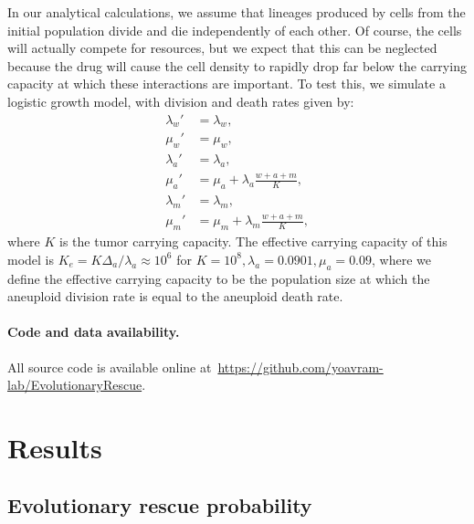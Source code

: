 \documentclass[12pt]{extarticle}
\begin{document}
In our analytical calculations, we assume that lineages produced by cells from the initial population divide and die independently of each other.
Of course, the cells will actually compete for resources, but we expect that this can be neglected because the drug will
cause the cell density to rapidly drop far below the carrying capacity at which these interactions are important.
To test this, we simulate a logistic growth model, with division and death rates given by:
\begin{align*}
\lambda_w' &= \lambda_w , \\
\mu_w' &= \mu_w ,\\
\lambda_a' &= \lambda_a ,\\ 
\mu_a' &= \mu_a + \lambda_a\frac{w+a+m}{K} ,\\
\lambda_m' &= \lambda_m ,\\ 
\mu_m' &= \mu_m + \lambda_m\frac{w+a+m}{K} ,
\end{align*}
where $K$ is the tumor carrying capacity. 
The effective carrying capacity of this model is $K_e=K\Delta_a/\lambda_a\approx10^6$ for $K=10^8, \lambda_a=0.0901,\mu_a=0.09$, where we define the effective carrying capacity to be the population size at which the aneuploid division rate is equal to the aneuploid death rate. 


\paragraph{Code and data availability.} All source code is available online at~\url{https://github.com/yoavram-lab/EvolutionaryRescue}.


\section*{Results}


\subsection*{Evolutionary rescue probability}
\end{document}
